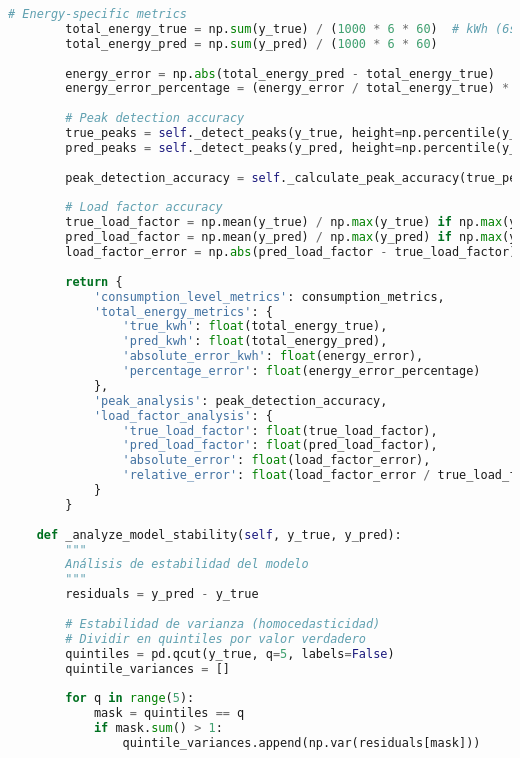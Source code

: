 \begin{lstlisting}[language=Python, caption=Framework integral de evaluación]
        # Energy-specific metrics
        total_energy_true = np.sum(y_true) / (1000 * 6 * 60)  # kWh (6s intervals)
        total_energy_pred = np.sum(y_pred) / (1000 * 6 * 60)
        
        energy_error = np.abs(total_energy_pred - total_energy_true)
        energy_error_percentage = (energy_error / total_energy_true) * 100
        
        # Peak detection accuracy
        true_peaks = self._detect_peaks(y_true, height=np.percentile(y_true, 90))
        pred_peaks = self._detect_peaks(y_pred, height=np.percentile(y_pred, 90))
        
        peak_detection_accuracy = self._calculate_peak_accuracy(true_peaks, pred_peaks, y_true, y_pred)
        
        # Load factor accuracy
        true_load_factor = np.mean(y_true) / np.max(y_true) if np.max(y_true) > 0 else 0
        pred_load_factor = np.mean(y_pred) / np.max(y_pred) if np.max(y_pred) > 0 else 0
        load_factor_error = np.abs(pred_load_factor - true_load_factor)
        
        return {
            'consumption_level_metrics': consumption_metrics,
            'total_energy_metrics': {
                'true_kwh': float(total_energy_true),
                'pred_kwh': float(total_energy_pred),
                'absolute_error_kwh': float(energy_error),
                'percentage_error': float(energy_error_percentage)
            },
            'peak_analysis': peak_detection_accuracy,
            'load_factor_analysis': {
                'true_load_factor': float(true_load_factor),
                'pred_load_factor': float(pred_load_factor),
                'absolute_error': float(load_factor_error),
                'relative_error': float(load_factor_error / true_load_factor * 100) if true_load_factor > 0 else 0
            }
        }
    
    def _analyze_model_stability(self, y_true, y_pred):
        """
        Análisis de estabilidad del modelo
        """
        residuals = y_pred - y_true
        
        # Estabilidad de varianza (homocedasticidad)
        # Dividir en quintiles por valor verdadero
        quintiles = pd.qcut(y_true, q=5, labels=False)
        quintile_variances = []
        
        for q in range(5):
            mask = quintiles == q
            if mask.sum() > 1:
                quintile_variances.append(np.var(residuals[mask]))
        

\end{lstlisting}
